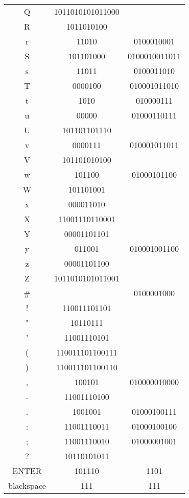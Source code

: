 \documentclass{article}
\numberwithin{equation}{section}
\begin{document}
\begin{center}
\begin{supertabular}{ccc}
                    Q  &  1011010101011000 &        \\
                    R  &  1011010100 &              \\
                    r  &  11010 &   0100010001      \\
                    S  &  101101000 &  0100010011011\\
                    s  &  11011 &    0100011010     \\
                    T  &  0000100 &    010001011010 \\
                    t  &  1010 &   010000111        \\
                    u  &  00000 &    01000110111    \\
                    U  &  101101101110 &            \\
                    v  &  0000111 &    010001011011 \\
                    V  &  101101010100 &            \\
                    w  &  101100 &    01000101100   \\
                    W  &  101101001 &               \\
                    x  &  000011010 &               \\
                    X  &  11001110110001 &          \\
                    Y  &  00001101101 &             \\
                    y  &  011001 &   010001001100   \\
                    z  &  00001101100 &             \\
                    Z  &  1011010101011001 &        \\
                    \#  &              & 0100001000  \\
                    !  & 110011101101  &            \\
                    "  & 10110111 &                 \\
                    '  & 11001110101 &              \\ 
                    (  & 110011101100111 &          \\
                    )  & 110011101100110 &          \\
                    ,  & 100101 & 010000010000      \\
                    -  & 11001110100 &              \\
                    .  & 1001001 & 01000100111      \\
                    :  & 11001110011 & 01000100100  \\
                    ;  & 11001110010 & 01000001001  \\
                    ?  & 10110101011&               \\
                    ENTER & 101110 & 1101            \\
                    blackspace   & 111 & 111        \\
            \hline  %
            \end{supertabular}
            \end{center}
        
\end{document}
